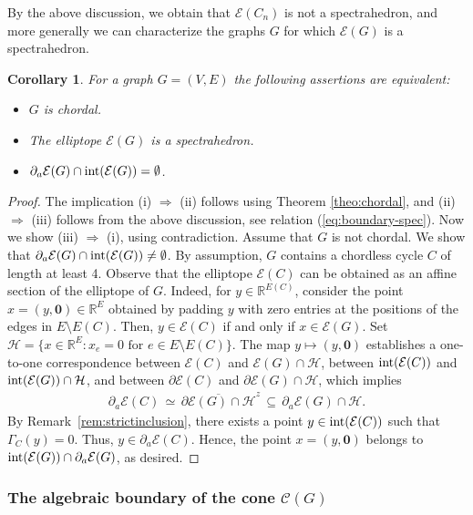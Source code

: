 \documentclass[a4paper, 11pt, twoside]{article}
\newcommand{\R}{\mathbb{R}}
\newcommand{\ME}{{\mathcal E}}
\newcommand{\MH}{{\mathcal H}}
\newcommand{\azero}{\mathbf{0}}
\theoremstyle{plain}
\newtheorem{corollary}[theorem]{Corollary}
\begin{document}
By the above discussion, we obtain that $\ME(C_n)$ is not a spectrahedron, and more generally we can characterize the graphs $G$ for which $\ME(G)$ is a spectrahedron.


\begin{corollary}\label{cor:spectrahedron}
For a graph $G=(V,E)$ the following assertions are equivalent:
\begin{itemize}
\item[(i)] $G$ is chordal.
\item[(ii)] The elliptope $\ME(G)$ is a spectrahedron.
\item[(iii)] $\partial_a\ME(G)\cap \text{\rm int} (\ME(G))=\emptyset$.
\end{itemize}
\end{corollary}

\begin{proof}
The implication (i) $\Longrightarrow$ (ii) follows using Theorem \ref{theo:chordal}, and  (ii) $\Longrightarrow$ (iii) follows from the above discussion, see relation (\ref{eq:boundary-spec}).
Now we show (iii) $\Longrightarrow$ (i), using contradiction. Assume that $G$ is not chordal. We show that  $\partial_a\ME(G)\cap \text{\rm int} (\ME(G))\ne \emptyset$.  By assumption, $G$ contains a chordless cycle $C$ of length at least 4. Observe that the elliptope $\ME(C)$ can be obtained as an affine section of the elliptope of $G$. Indeed,  for   $y\in \R^{E(C)}$,  consider the point
$x=(y,\azero)\in \R^E$ obtained by padding $y$ with zero entries at the positions of the edges in $E \setminus E(C)$. Then, $y\in\ME(C)$ if and only if $x\in \ME(G)$. Set $\MH=\{x\in\R^E: x_e=0 \text{ for } e\in E\setminus E(C)\}$. The map $y\mapsto  (y,\azero)$ establishes a one-to-one correspondence between $\ME(C)$ and $\ME(G)\cap \MH$,   between   $\text{\rm int} (\ME(C))$ and $\text{\rm int} (\ME(G)) \cap \MH$, and between   $\partial \ME(C)$ and $ \partial \ME(G)\cap \MH$, which implies
\begin{align*}
 \partial_a\ME(C) \, \simeq \,  \overline{\partial\ME(G)\cap \MH}^z \, \subseteq \, \partial_a \ME(G)\cap \MH.
\end{align*}
By Remark~\ref{rem:strictinclusion},  there exists a point $y\in \text{\rm int}( \ME(C))$ such that $\Gamma_C(y)=0$.
 Thus, $y\in\partial_a\ME(C)$. Hence, the point $x=(y,\azero)$ belongs to $\text{\rm int}(\ME(G))\cap \partial_a\ME(G)$, as desired.
\end{proof}


\subsubsection*{The algebraic boundary of the cone $\mathscr{C}(G)$}
\end{document}
